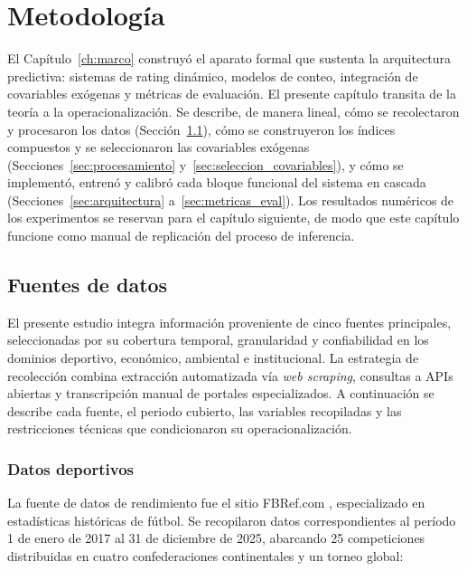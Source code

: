 \chapter{Metodolog\'ia}
\label{ch:metodologia}

El Cap\'itulo~\ref{ch:marco} construy\'o el aparato formal que sustenta la arquitectura predictiva: sistemas de rating din\'amico, modelos de conteo, integraci\'on de covariables ex\'ogenas y m\'etricas de evaluaci\'on. El presente cap\'itulo transita de la teor\'ia a la operacionalizaci\'on. Se describe, de manera lineal, c\'omo se recolectaron y procesaron los datos (Secci\'on~\ref{sec:fuentes}), c\'omo se construyeron los \'indices compuestos y se seleccionaron las covariables ex\'ogenas (Secciones~\ref{sec:procesamiento} y~\ref{sec:seleccion_covariables}), y c\'omo se implement\'o, entren\'o y calibr\'o cada bloque funcional del sistema en cascada (Secciones~\ref{sec:arquitectura} a~\ref{sec:metricas_eval}). Los resultados num\'ericos de los experimentos se reservan para el cap\'itulo siguiente, de modo que este cap\'itulo funcione como manual de replicaci\'on del proceso de inferencia.


\section{Fuentes de datos}
\label{sec:fuentes}

El presente estudio integra informaci\'on proveniente de cinco fuentes principales, seleccionadas por su cobertura temporal, granularidad y confiabilidad en los dominios deportivo, econ\'omico, ambiental e institucional. La estrategia de recolecci\'on combina extracci\'on automatizada v\'ia \textit{web scraping}, consultas a APIs abiertas y transcripci\'on manual de portales especializados. A continuaci\'on se describe cada fuente, el periodo cubierto, las variables recopiladas y las restricciones t\'ecnicas que condicionaron su operacionalizaci\'on.

\subsection{Datos deportivos}
\label{subsec:fbref}

La fuente de datos de rendimiento fue el sitio FBRef.com \cite{FBRef}, especializado en estad\'isticas hist\'oricas de f\'utbol. Se recopilaron datos correspondientes al per\'iodo 1 de enero de 2017 al 31 de diciembre de 2025, abarcando 25 competiciones distribuidas en cuatro confederaciones continentales y un torneo global:

